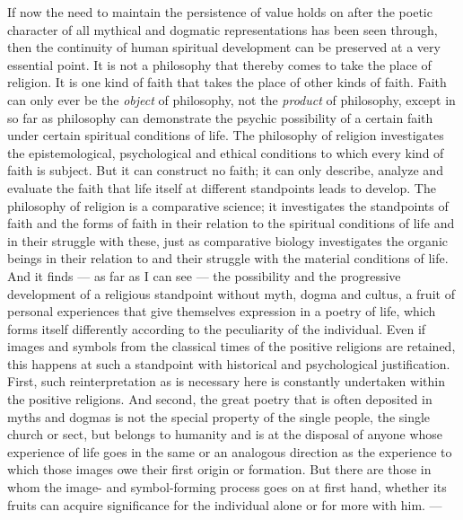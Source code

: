 \documentclass[12pt,a4paper,openany]{book}
\newcommand{\opage}[1]{\marginnote{\footnotesize\textit{[#1]}}}
\begin{document}
If now the need to maintain the persistence of value holds on after the poetic character
of all mythical and dogmatic representations has been seen through, then the continuity
of human spiritual development can be preserved at a very essential point. It is not a
philosophy that thereby comes to take the place of religion. It is one kind of faith that
takes the place of other kinds of faith. Faith can only ever be the \textit{object} of
philosophy, not the \textit{product} of philosophy, except in so far as philosophy can
demonstrate the psychic possibility of a certain faith under certain spiritual conditions
of life. The philosophy of religion investigates the epistemological, psychological and
ethical conditions to which every kind of faith is subject. But it can construct no
faith; it can only describe, analyze
\setcounter{footnote}{0}%
\opage{238}and evaluate the faith that life itself at different standpoints leads to develop.
The philosophy of religion is a comparative science; it investigates the standpoints of
faith and the forms of faith in their relation to the spiritual conditions of life and in
their struggle with these, just as comparative biology investigates the organic beings in
their relation to and their struggle with the material conditions of life. And it finds
--- as far as I can see --- the possibility and the progressive development of a
religious standpoint without myth, dogma and cultus, a fruit of personal experiences that
give themselves expression in a poetry of life, which forms itself differently according
to the peculiarity of the individual. Even if images and symbols from the classical times
of the positive religions are retained, this happens at such a standpoint with historical
and psychological justification. First, such reinterpretation as is necessary here is
constantly undertaken within the positive religions. And second, the great poetry that is
often deposited in myths and dogmas is not the special property of the single people, the
single church or sect, but belongs to humanity and is at the disposal of anyone whose
experience of life goes in the same or an analogous direction as the experience to which
those images owe their first origin or formation. But there are those in whom the image-
and symbol-forming process goes on at first hand, whether its fruits can acquire
significance for the individual alone or for more with him. ---
\end{document}
